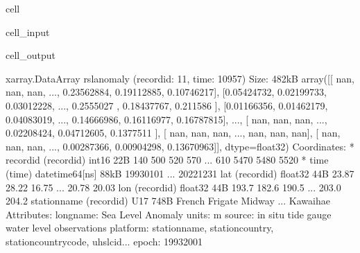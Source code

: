 \documentclass[letterpaper,10pt,english]{jupyterBook}
\begin{document}
\begin{sphinxuseclass}{cell}
\begin{sphinxVerbatimInput}
\begin{sphinxuseclass}{cell_input}
\begin{sphinxVerbatim}[commandchars=\\\{\}]
\end{sphinxVerbatim}

\end{sphinxuseclass}\end{sphinxVerbatimInput}
\begin{sphinxVerbatimOutput}

\begin{sphinxuseclass}{cell_output}
\begin{sphinxVerbatim}[commandchars=\\\{\}]
\PYGZlt{}xarray.DataArray \PYGZsq{}rsl\PYGZus{}anomaly\PYGZsq{} (record\PYGZus{}id: 11, time: 10957)\PYGZgt{} Size: 482kB
array([[        nan,         nan,         nan, ...,  0.23562884,
         0.19112885,  0.10746217],
       [\PYGZhy{}0.05424732, \PYGZhy{}0.02199733, \PYGZhy{}0.03012228, ...,  0.2555027 ,
         0.18437767,  0.211586  ],
       [\PYGZhy{}0.01166356, \PYGZhy{}0.01462179, \PYGZhy{}0.04083019, ...,  0.14666986,
         0.16116977,  0.16787815],
       ...,
       [        nan,         nan,         nan, ..., \PYGZhy{}0.02208424,
        \PYGZhy{}0.04712605, \PYGZhy{}0.1377511 ],
       [        nan,         nan,         nan, ...,         nan,
                nan,         nan],
       [        nan,         nan,         nan, ...,  0.00287366,
        \PYGZhy{}0.00904298, \PYGZhy{}0.13670963]], dtype=float32)
Coordinates:
  * record\PYGZus{}id     (record\PYGZus{}id) int16 22B 140 500 520 570 ... 610 5470 5480 5520
  * time          (time) datetime64[ns] 88kB 1993\PYGZhy{}01\PYGZhy{}01 ... 2022\PYGZhy{}12\PYGZhy{}31
    lat           (record\PYGZus{}id) float32 44B 23.87 28.22 16.75 ... 20.78 20.03
    lon           (record\PYGZus{}id) float32 44B 193.7 182.6 190.5 ... 203.0 204.2
    station\PYGZus{}name  (record\PYGZus{}id) \PYGZlt{}U17 748B \PYGZsq{}French Frigate\PYGZsq{} \PYGZsq{}Midway\PYGZsq{} ... \PYGZsq{}Kawaihae\PYGZsq{}
Attributes:
    long\PYGZus{}name:  Sea Level Anomaly
    units:      m
    source:     in situ tide gauge water level observations
    platform:   station\PYGZus{}name, station\PYGZus{}country, station\PYGZus{}country\PYGZus{}code, uhslc\PYGZus{}id...
    epoch:      1993\PYGZhy{}2001
\end{sphinxVerbatim}

\end{sphinxuseclass}\end{sphinxVerbatimOutput}

\end{sphinxuseclass}
\end{document}
